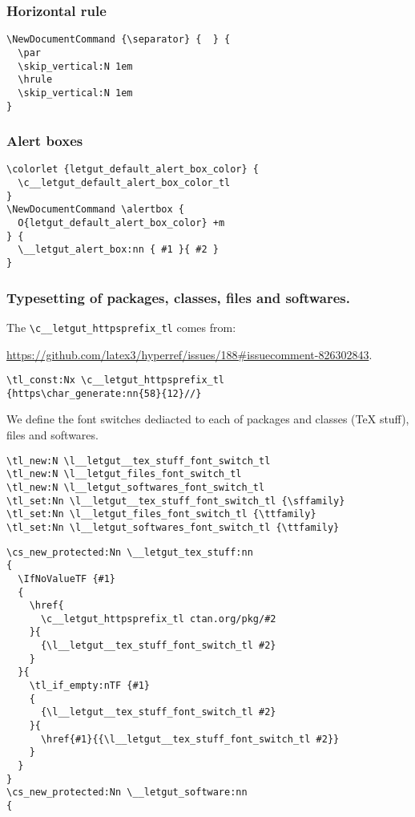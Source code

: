 \documentclass{letgut}
\begin{document}
\subsubsection{Horizontal rule}
\label{ImplementationDocumentcommandsHorizontalrule-8vsg55h0jlj0}
\begin{lstlisting}
\NewDocumentCommand {\separator} {  } {
  \par
  \skip_vertical:N 1em
  \hrule
  \skip_vertical:N 1em
}
\end{lstlisting}

\subsubsection{Alert boxes}
\label{ImplementationDocumentcommandsAlertboxes-ijtg55h0jlj0}
\begin{lstlisting}
\colorlet {letgut_default_alert_box_color} {
  \c__letgut_default_alert_box_color_tl
}
\NewDocumentCommand \alertbox {
  O{letgut_default_alert_box_color} +m
} {
  \__letgut_alert_box:nn { #1 }{ #2 }
}
\end{lstlisting}

\subsubsection{Typesetting of packages, classes, files and softwares.}
\label{ImplementationDocumentcommandsTypesettingofpackagesclassesfilesandsoftwares-09ug55h0jlj0}
The \lstinline+\c__letgut_httpsprefix_tl+ comes from:

\url{https://github.com/latex3/hyperref/issues/188\#issuecomment-826302843}.

\begin{lstlisting}
\tl_const:Nx \c__letgut_httpsprefix_tl
{https\char_generate:nn{58}{12}//}
\end{lstlisting}
We define the font switches dediacted to each of packages and classes
(\TeX{} stuff), files and softwares.
\begin{lstlisting}
\tl_new:N \l__letgut__tex_stuff_font_switch_tl
\tl_new:N \l__letgut_files_font_switch_tl
\tl_new:N \l__letgut_softwares_font_switch_tl
\tl_set:Nn \l__letgut__tex_stuff_font_switch_tl {\sffamily}
\tl_set:Nn \l__letgut_files_font_switch_tl {\ttfamily}
\tl_set:Nn \l__letgut_softwares_font_switch_tl {\ttfamily}
\end{lstlisting}

\begin{lstlisting}
\cs_new_protected:Nn \__letgut_tex_stuff:nn
{
  \IfNoValueTF {#1}
  {
    \href{
      \c__letgut_httpsprefix_tl ctan.org/pkg/#2
    }{
      {\l__letgut__tex_stuff_font_switch_tl #2}
    }
  }{
    \tl_if_empty:nTF {#1}
    {
      {\l__letgut__tex_stuff_font_switch_tl #2}
    }{
      \href{#1}{{\l__letgut__tex_stuff_font_switch_tl #2}}
    }
  }
}
\cs_new_protected:Nn \__letgut_software:nn
{
\end{lstlisting}
\end{document}

